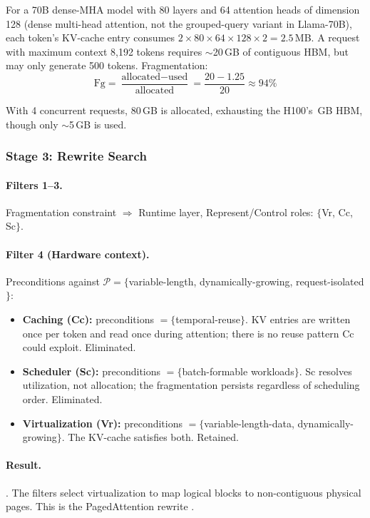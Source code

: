 \documentclass[10pt,twocolumn]{article}
\newcommand{\cvalint}[1]{\pgfmathprintnumber[fixed, precision=0, 1000 sep={\,}]{#1}}
\begin{document}
For a 70B dense-MHA model with 80 layers and 64 attention heads of dimension 128 (dense multi-head attention, not the grouped-query variant in Llama-70B), each token's KV-cache entry consumes $2 \times 80 \times 64 \times 128 \times 2 = 2.5$\,MB. A request with maximum context 8,192 tokens requires $\sim$20\,GB of contiguous HBM, but may only generate 500 tokens. Fragmentation:
\begin{equation*}
\text{Fg} = \frac{\text{allocated} - \text{used}}{\text{allocated}} = \frac{20 - 1.25}{20} \approx 94\%
\end{equation*}

With 4 concurrent requests, 80\,GB is allocated, exhausting the H100's \cvalint{\HhHBMGB}\,GB HBM, though only $\sim$5\,GB is used.

\subsubsection{Stage 3: Rewrite Search}

\paragraph{Filters 1--3.} Fragmentation constraint $\Rightarrow$ Runtime layer, Represent/Control roles: $\{$Vr, Cc, Sc$\}$.

\paragraph{Filter 4 (Hardware context).} Preconditions against $\mathcal{P} = \{$variable-length, dynamically-growing, request-isolated$\}$:
\begin{itemize}[nosep]
\item \textbf{Caching (Cc):} preconditions $= \{$temporal-reuse$\}$. KV entries are written once per token and read once during attention; there is no reuse pattern Cc could exploit. Eliminated.
\item \textbf{Scheduler (Sc):} preconditions $= \{$batch-formable workloads$\}$. Sc resolves utilization, not allocation; the fragmentation persists regardless of scheduling order. Eliminated.
\item \textbf{Virtualization (Vr):} preconditions $= \{$variable-length-data, dynamically-growing$\}$. The KV-cache satisfies both. Retained.
\end{itemize}

\paragraph{Result.} . The filters select virtualization to map logical blocks to non-contiguous physical pages. This is the PagedAttention rewrite \citep{kwon2023}.
\end{document}
